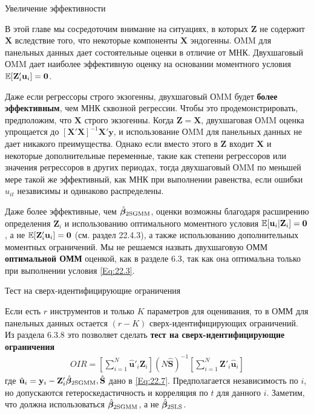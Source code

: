 {\centering Увеличение эффективности}

В этой главе мы сосредоточим внимание на ситуациях, в которых $\mathbf Z$ не содержит $\mathbf X$ вследствие того, что некоторые компоненты $ \mathbf X$ эндогенны. ОMM для панельных данных дает состоятельные оценки в отличие от МНК. Двухшаговый ОMM дает наиболее эффективную оценку на основании моментного условия $\mathbb{E}[ \mathbf Z'_i \mathbf u_i]=\mathbf 0$.

Даже если регрессоры строго экзогенны, двухшаговый ОMM будет \textbf{более эффективным}, чем МНК сквозной регрессии. Чтобы это продемонстрировать, предположим, что $\mathbf X$ строго экзогенны. Когда $\mathbf Z = \mathbf X$, двухшаговая ОMM оценка упрощается до  $[\mathbf X' \mathbf X]^{-1}\mathbf X' \mathbf y$, и использование ОMM для панельных данных не дает никакого преимущества. Однако если вместо этого в $\mathbf Z$  входит $\mathbf X$ и некоторые дополнительные переменные, такие как степени регрессоров или значения регрессоров в других периодах, тогда двухшаговый ОMM по меньшей мере такой же эффективный, как МНК при выполнении равенства, если ошибки $u_{it}$ независимы и одинаково распределены.

Даже более эффективные, чем $\hat{\bm{\beta}}_{\mathrm{2SGMM}}$, оценки возможны благодаря расширению определения $\mathbf Z_i$ и использованию оптимального моментного условия $\mathbb{E}[ \mathbf u_i| \mathbf Z_i]= \mathbf 0$, а не $\mathbb{E}[ \mathbf Z'_i \mathbf u_i] = \mathbf 0$ (см. раздел 22.4.3), а также использованию дополнительных моментных ограничений. Мы не решаемся назвать двухшаговую ОММ \textbf{оптимальной ОММ} оценкой,  как в разделе 6.3, так как она оптимальна только при выполнении условия \ref{Eq:22.3}.

{\centering Тест на сверх-идентифицирующие ограничения}

Если есть $r$  инструментов и только $K$  параметров для оценивания, то в ОММ для панельных данных остается $(r-K)$ сверх-идентифицирующих ограничений. Из раздела 6.3.8 это позволяет сделать \textbf{тест на сверх-идентифицирующие ограничения}
\begin{align}
OIR= \left[ \sum^N_{i=1} \hat{\mathbf u}'_i \mathbf Z_i \right] 
(N \hat{\mathbf S})^{-1}
 \left[ \sum^N_{i=1} \mathbf Z'_i \hat{\mathbf u}_i \right] 
\label{Eq:22.10}
\end{align}
где $\hat{ \mathbf u}_i=\mathbf y_i- \mathbf Z'_i \hat{\bm{\beta}}_{\mathrm{2SGMM}}, \hat{\mathbf S}$ дано в \ref{Eq:22.7}. Предполагается независимость по $i$, но допускаются гетероскедастичность и корреляция по $t$ для данного $i$. Заметим, что должна использоваться $\hat{\bm{\beta}}_{\mathrm{2SGMM}}$, а не $\hat{\bm{\beta}}_{\mathrm{2SLS}}$.


